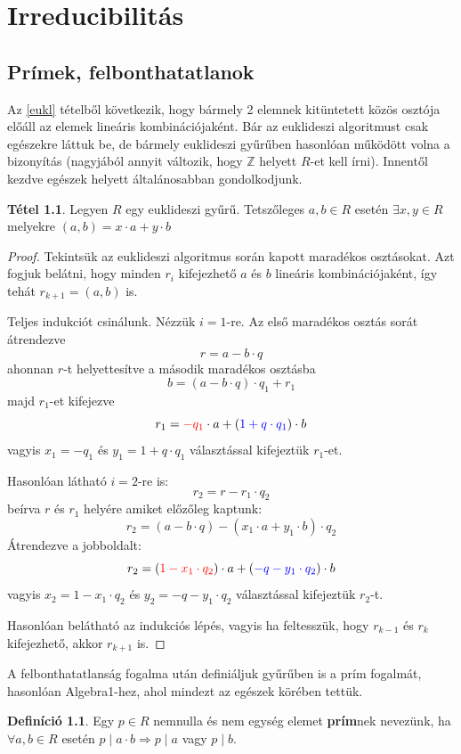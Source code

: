 \documentclass[12pt]{book}
\theoremstyle{plain} %
\theoremstyle{definition} %
\newtheorem{defi/}{Definíció}[section]
\newenvironment{defi}
  {\renewcommand{\qedsymbol}{$\clubsuit$}%
   \pushQED{\qed}\begin{defi/}}
  {\popQED\end{defi/}}
\newtheorem{theo/}{Tétel}[section]
\newenvironment{theo}
  {\renewcommand{\qedsymbol}{$\clubsuit$}%
   \pushQED{\qed}\begin{theo/}}
  {\popQED\end{theo/}}
\theoremstyle{remark}
\renewcommand\qedsymbol{$\blacksquare$}
\numberwithin{equation}{section}  %
\begin{document}
	\chapter{Irreducibilitás}
	\section{Prímek, felbonthatatlanok}
	Az \ref{eukl} tételből következik, hogy bármely 2 elemnek kitüntetett közös osztója előáll az elemek lineáris kombinációjaként. Bár az euklideszi algoritmust csak egészekre láttuk be, de bármely euklideszi gyűrűben hasonlóan működött volna a bizonyítás (nagyjából annyit változik, hogy $\mathbb{Z}$ helyett $R$-et kell írni). Innentől kezdve egészek helyett általánosabban gondolkodjunk.
	\begin{theo}
		Legyen $R$ egy euklideszi gyűrű. Tetszőleges $a,b\in R$ esetén $\exists x,y\in R$ melyekre $(a,b) = x\cdot a + y\cdot b$
	\end{theo}
	\begin{proof}
		Tekintsük az euklideszi algoritmus során kapott maradékos osztásokat. Azt fogjuk belátni, hogy minden $r_i$ kifejezhető $a$ és $b$ lineáris kombinációjaként, így tehát $r_{k+1}=(a,b)$ is.
		
		Teljes indukciót csinálunk. Nézzük $i=1$-re. Az első maradékos osztás sorát átrendezve
		\[ r = a - b\cdot q  \]
		ahonnan $r$-t helyettesítve a második maradékos osztásba
		\[ b = (a-b\cdot q)\cdot q_1 + r_1  \]
		majd $r_1$-et kifejezve
		\[ r_1 = \color{red} -q_1 \color{black} \cdot a + ( \color{blue} 1+q\cdot q_1 \color{black} ) \cdot b  \]
		vagyis $x_1 = -q_1$ és $y_1 = 1+q\cdot q_1$ választással kifejeztük $r_1$-et.
		
		Hasonlóan látható $i=2$-re is:
		\[ r_2 = r - r_1 \cdot q_2  \]
		beírva $r$ és $r_1$ helyére amiket előzőleg kaptunk:
		\[ r_2 = (a-b\cdot q) - (x_1\cdot a + y_1\cdot b)\cdot q_2 \]
		Átrendezve a jobboldalt:
		\[ r_2 = (\color{red} 1-x_1\cdot q_2 \color{black} )\cdot a + (\color{blue} -q-y_1\cdot q_2 \color{black} )\cdot b  \]
		vagyis $x_2 = 1-x_1\cdot q_2$ és $y_2 = -q-y_1\cdot q_2$ választással kifejeztük $r_2$-t.
		
		Hasonlóan belátható az indukciós lépés, vagyis ha feltesszük, hogy $r_{k-1}$ és $r_k$ kifejezhető, akkor $r_{k+1}$ is.
	\end{proof}
	A felbonthatatlanság fogalma után definiáljuk gyűrűben is a prím fogalmát, hasonlóan Algebra1-hez, ahol mindezt az egészek körében tettük.
	\begin{defi}
		Egy $p\in R$ nemnulla és nem egység elemet \textbf{prím}nek nevezünk, ha $\forall a,b\in R$ esetén $p\mid a\cdot b \Rightarrow p\mid a$ vagy $p\mid b$.
	\end{defi}
\end{document}
